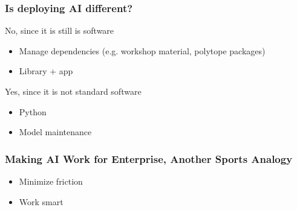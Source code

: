 \begin{frame}
\frametitle{Is deploying AI different?}

No, since it is still is software
\begin{itemize}
\item Manage dependencies (e.g. workshop material, polytope packages)
\item Library + app
\end{itemize}

Yes, since it is not standard software
\begin{itemize}
    \item Python
    \item Model maintenance
\end{itemize}
\end{frame}

\begin{frame}
\frametitle{Making AI Work for Enterprise, Another Sports Analogy}
\begin{itemize}
\item Minimize friction
\item Work smart
\end{itemize}
\end{frame}
